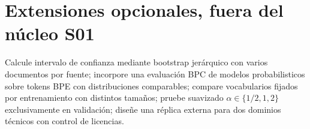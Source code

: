\section*{Extensiones opcionales, fuera del núcleo S01}
Calcule intervalo de confianza mediante bootstrap jerárquico con varios
documentos por fuente; incorpore una evaluación BPC de modelos probabilisticos sobre tokens
BPE con distribuciones comparables; compare
vocabularios fijados por entrenamiento con distintos tamaños; pruebe
suavizado $\alpha\in\{1/2,1,2\}$ exclusivamente en validación; diseñe una
réplica externa para dos dominios técnicos con control de licencias.
